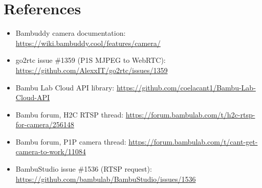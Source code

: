 \documentclass[11pt]{article}
\begin{document}
\section{References}
\begin{itemize}[itemsep=2pt]
  \item Bambuddy camera documentation: \url{https://wiki.bambuddy.cool/features/camera/}
  \item go2rtc issue \#1359 (P1S MJPEG to WebRTC): \url{https://github.com/AlexxIT/go2rtc/issues/1359}
  \item Bambu Lab Cloud API library: \url{https://github.com/coelacant1/Bambu-Lab-Cloud-API}
  \item Bambu forum, H2C RTSP thread: \url{https://forum.bambulab.com/t/h2c-rtsp-for-camera/256148}
  \item Bambu forum, P1P camera thread: \url{https://forum.bambulab.com/t/cant-get-camera-to-work/11084}
  \item BambuStudio issue \#1536 (RTSP request): \url{https://github.com/bambulab/BambuStudio/issues/1536}
\end{itemize}
\end{document}
